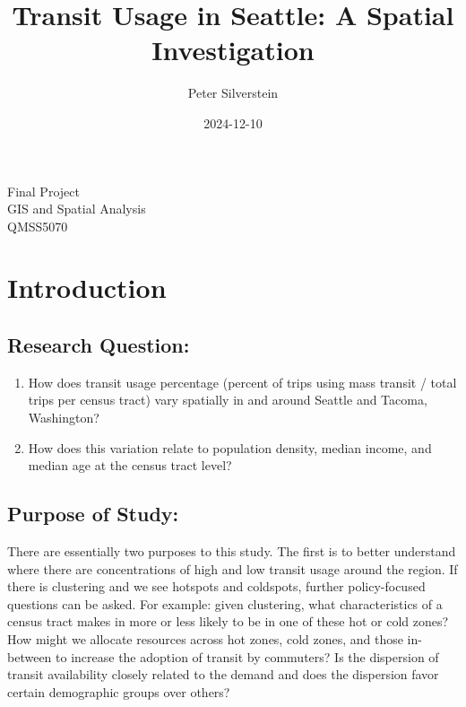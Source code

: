 \documentclass[
]{article}
\title{Transit Usage in Seattle: A Spatial Investigation}
\author{Peter Silverstein}
\date{2024-12-10}
\providecommand{\tightlist}{%
  \setlength{\itemsep}{0pt}\setlength{\parskip}{0pt}}
\begin{document}
\maketitle

\begin{center}
    {\large Final Project}\\[0.5cm]
    {\large GIS and Spatial Analysis}\\[0.5cm]
    {\large QMSS5070}\\[0.5cm]
\end{center}

\newpage

\section{Introduction}\label{introduction}

\subsection{Research Question:}\label{research-question}

\begin{enumerate}
\def\labelenumi{\arabic{enumi}.}
\tightlist
\item
  How does transit usage percentage (percent of trips using mass transit
  / total trips per census tract) vary spatially in and around Seattle
  and Tacoma, Washington?
\item
  How does this variation relate to population density, median income,
  and median age at the census tract level?
\end{enumerate}

\subsection{Purpose of Study:}\label{purpose-of-study}

There are essentially two purposes to this study. The first is to better
understand where there are concentrations of high and low transit usage
around the region. If there is clustering and we see hotspots and
coldspots, further policy-focused questions can be asked. For example:
given clustering, what characteristics of a census tract makes in more
or less likely to be in one of these hot or cold zones? How might we
allocate resources across hot zones, cold zones, and those in-between to
increase the adoption of transit by commuters? Is the dispersion of
transit availability closely related to the demand and does the
dispersion favor certain demographic groups over others?
\end{document}
